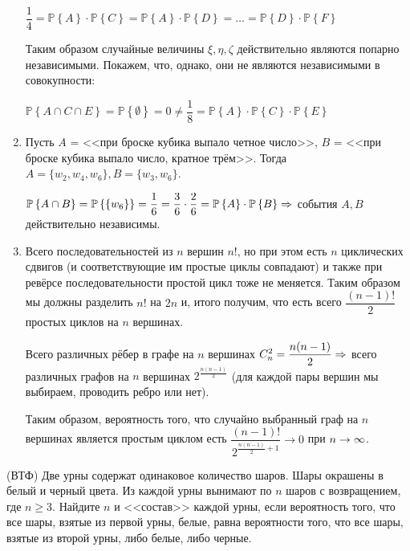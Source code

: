 \documentclass[a4paper,12pt]{article}
\newcommand{\prob}[1]{\mathbb{P}\left\{#1\right\}}
\begin{document}
\begin{solution}
\begin{enumerate}
		$\dfrac{1}{4} = \prob{A} \cdot \prob{C} = \prob{A} \cdot \prob{D} = \ldots = \prob{D} \cdot \prob{F}$
		
		Таким образом случайные величины $\xi, \eta, \zeta$ действительно являются попарно независимыми. Покажем, что, однако, они не являются независимыми в совокупности: 
		
		$\prob{A \cap C \cap E} = \prob{\emptyset} = 0 \neq \dfrac{1}{8} = \prob{A}\cdot \prob{C}\cdot \prob{E}$
		
		\item Пусть $A$ = <<при броске кубика выпало четное число>>, $B$ = <<при броске кубика выпало число, кратное трём>>. Тогда $A = \{w_2, w_4, w_6\}, B = \{w_3, w_6\}$.
		
		$\prob{A \cap B} = \prob{\{w_6\}} = \dfrac{1}{6} = \dfrac{3}{6} \cdot \dfrac{2}{6} = \prob{A} \cdot \prob{B} \Ra$ события $A, B$ действительно независимы.
		
		\item Всего последовательностей из $n$ вершин $n!$, но при этом есть $n$ циклических сдвигов (и соответствующие им простые циклы совпадают) и также при ревёрсе последовательности простой цикл тоже не меняется. Таким образом мы должны разделить $n!$ на $2n$ и, итого получим, что есть всего $\dfrac{(n-1)!}{2}$ простых циклов на $n$ вершинах.
		
		Всего различных рёбер в графе на $n$ вершинах $C_n^2 = \dfrac{n(n-1)}{2} \Rightarrow$ всего различных графов на $n$ вершинах $2^{\frac{n(n-1)}{2}}$ (для каждой пары вершин мы выбираем, проводить ребро или нет).
		
		Таким образом, вероятность того, что случайно выбранный граф на $n$ вершинах является простым циклом есть $\dfrac{(n-1)!}{2^{\frac{n(n-1)}{2} + 1}} \longrightarrow 0$ при $n \rightarrow \infty$.
	\end{enumerate}
\end{solution}

\vspace{5mm}

\begin{tasknum}{3}
	(ВТФ) Две урны содержат одинаковое количество шаров. Шары окрашены в белый и черный цвета. Из каждой урны вынимают по $n$ шаров с возвращением, где $n \geq 3$. Найдите $n$ и <<состав>> каждой урны, если вероятность того, что все шары, взятые из первой урны, белые, равна вероятности того, что все шары, взятые из второй урны, либо белые, либо черные.
\end{tasknum}
\end{document}
